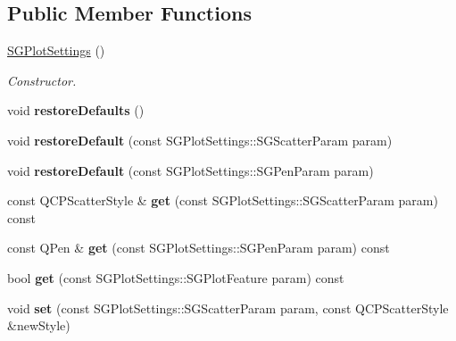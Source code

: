 \subsection*{Public Member Functions}
\begin{DoxyCompactItemize}
\item 
\mbox{\label{classSGPlotSettings_ac788d0490d12b5422f27631db51c4411}} 
\hyperlink{classSGPlotSettings_ac788d0490d12b5422f27631db51c4411}{S\+G\+Plot\+Settings} ()
\begin{DoxyCompactList}\small\item\em Constructor. \end{DoxyCompactList}\item 
\mbox{\label{classSGPlotSettings_a1048c1e82e135c3c8bae919c1e47f09c}} 
void {\bfseries restore\+Defaults} ()
\item 
\mbox{\label{classSGPlotSettings_aed5e0cdec60f428e9aa3ae25172eaf8b}} 
void {\bfseries restore\+Default} (const S\+G\+Plot\+Settings\+::\+S\+G\+Scatter\+Param param)
\item 
\mbox{\label{classSGPlotSettings_abf35a7b6b2d9dad699527270ff334916}} 
void {\bfseries restore\+Default} (const S\+G\+Plot\+Settings\+::\+S\+G\+Pen\+Param param)
\item 
\mbox{\label{classSGPlotSettings_abb2a031b4b0aeaa9a5c04bfeb99939d2}} 
const Q\+C\+P\+Scatter\+Style \& {\bfseries get} (const S\+G\+Plot\+Settings\+::\+S\+G\+Scatter\+Param param) const
\item 
\mbox{\label{classSGPlotSettings_ac0163bf092eff5613834272e8535be20}} 
const Q\+Pen \& {\bfseries get} (const S\+G\+Plot\+Settings\+::\+S\+G\+Pen\+Param param) const
\item 
\mbox{\label{classSGPlotSettings_ab6a9ce3dc76d6ad187487d17e5b759e0}} 
bool {\bfseries get} (const S\+G\+Plot\+Settings\+::\+S\+G\+Plot\+Feature param) const
\item 
\mbox{\label{classSGPlotSettings_a962a48121fca1edf4acdd485d941fee3}} 
void {\bfseries set} (const S\+G\+Plot\+Settings\+::\+S\+G\+Scatter\+Param param, const Q\+C\+P\+Scatter\+Style \&new\+Style)

\end{DoxyCompactItemize}
